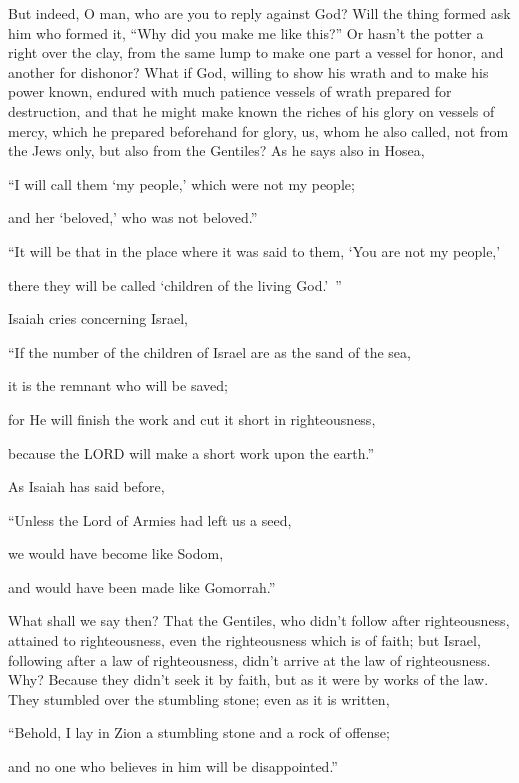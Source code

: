 {But indeed, O man, who are you to reply against God? Will the thing formed ask him who formed it, “Why did you make me like this?”
Or hasn’t the potter a right over the clay, from the same lump to make one part a vessel for honor, and another for dishonor?
What if God, willing to show his wrath and to make his power known, endured with much patience vessels of wrath prepared for destruction,
and that he might make known the riches of his glory on vessels of mercy, which he prepared beforehand for glory,
us, whom he also called, not from the Jews only, but also from the Gentiles?
As he says also in Hosea,
\par }{\Q “I will call them ‘my people,’ which were not my people;
\par }{\QB and her ‘beloved,’ who was not beloved.”
\par }{\Q {}“It will be that in the place where it was said to them, ‘You are not my people,’
\par }{\QB there they will be called ‘children of the living God.’ ”
\par }{\PP {}Isaiah cries concerning Israel,
\par }{\Q “If the number of the children of Israel are as the sand of the sea,
\par }{\QB it is the remnant who will be saved;
\par }{\Q {}for He will finish the work and cut it short in righteousness,
\par }{\QB because the LORD will make a short work upon the earth.”
\par }{\PP {}As Isaiah has said before,
\par }{\Q “Unless the Lord of Armies had left us a seed,
\par }{\QB we would have become like Sodom,
\par }{\QB and would have been made like Gomorrah.”
\par }{\PP {}What shall we say then? That the Gentiles, who didn’t follow after righteousness, attained to righteousness, even the righteousness which is of faith;
but Israel, following after a law of righteousness, didn’t arrive at the law of righteousness.
Why? Because they didn’t seek it by faith, but as it were by works of the law. They stumbled over the stumbling stone;
even as it is written,
\par }{\Q “Behold, I lay in Zion a stumbling stone and a rock of offense;
\par }{\QB and no one who believes in him will be disappointed.”

}
